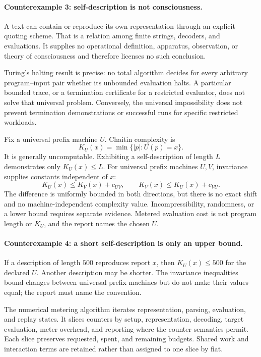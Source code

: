 \paragraph{Counterexample 3: self-description is not consciousness.}
A text can contain or reproduce its own representation through an explicit quoting scheme.  That is a relation among
finite strings, decoders, and evaluations.  It supplies no operational definition, apparatus, observation, or theory
of consciousness and therefore licenses no such conclusion.

Turing's halting result is precise: no total algorithm decides for every arbitrary program--input pair whether its
unbounded evaluation halts.  A particular bounded trace, or a termination certificate for a restricted evaluator,
does not solve that universal problem.  Conversely, the universal impossibility does not prevent termination
demonstrations or successful runs for specific restricted workloads.

Fix a universal prefix machine \(U\).  Chaitin complexity is
\[
                         K_U(x)=\min\{|p|:U(p)=x\}.
\]
It is generally uncomputable.  Exhibiting a self-description of length \(L\) demonstrates only \(K_U(x)\leq L\).
For universal prefix machines \(U,V\), invariance supplies constants independent of \(x\):
\[
K_U(x)\leq K_V(x)+c_{UV},\qquad K_V(x)\leq K_U(x)+c_{VU}.
\]
The difference is uniformly bounded in both directions, but there is no exact shift and no machine-independent
complexity value.  Incompressibility, randomness, or a lower bound requires separate evidence.  Metered evaluation
cost is not program length or \(K_U\), and the report names the chosen \(U\).

\paragraph{Counterexample 4: a short self-description is only an upper bound.}
If a description of length \(500\) reproduces report \(x\), then \(K_U(x)\leq500\) for the declared \(U\).  Another
description may be shorter.  The invariance inequalities bound changes between universal prefix machines but do not
make their values equal; the report must name the convention.

The numerical metering algorithm iterates representation, parsing, evaluation, and replay states.  It slices counters
by setup, representation, decoding, target evaluation, meter overhead, and reporting where the counter semantics
permit.  Each slice preserves requested, spent, and remaining budgets.  Shared work and interaction terms are retained
rather than assigned to one slice by fiat.

